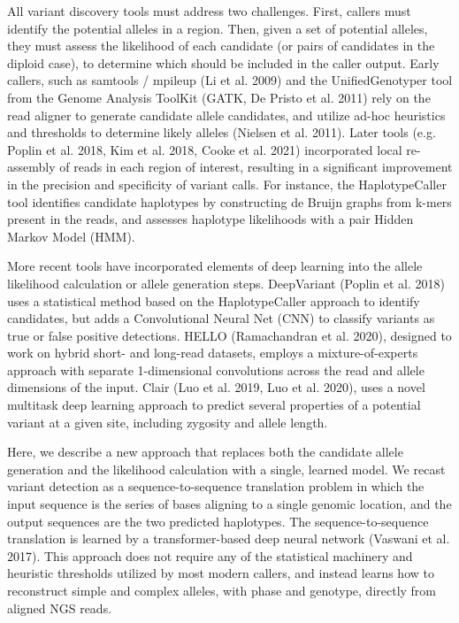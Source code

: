 \documentclass[]{article}
\begin{document}
All variant discovery tools must address two challenges. First, callers must identify the potential alleles in a region. Then, given a set of potential alleles, they must assess the likelihood of each candidate (or pairs of candidates in the diploid case), to determine which should be included in the caller output. Early callers, such as samtools / mpileup (Li et al. 2009) and the UnifiedGenotyper tool from the Genome Analysis ToolKit (GATK, De Pristo et al. 2011) rely on the read aligner to generate candidate allele candidates, and utilize ad-hoc heuristics and thresholds to determine likely alleles (Nielsen et al. 2011). Later tools (e.g. Poplin et al. 2018, Kim et al. 2018, Cooke et al. 2021) incorporated local re-assembly of reads in each region of interest, resulting in a significant improvement in the precision and specificity of variant calls. For instance, the HaplotypeCaller tool identifies candidate haplotypes by constructing de Bruijn graphs from k-mers present in the reads, and assesses haplotype likelihoods with a pair Hidden Markov Model (HMM). 

More recent tools have incorporated elements of deep learning into the allele likelihood calculation or allele generation steps. DeepVariant (Poplin et al. 2018) uses a statistical method based on the HaplotypeCaller approach to identify candidates, but adds a Convolutional Neural Net (CNN) to classify variants as true or false positive detections. HELLO (Ramachandran et al. 2020), designed to work on hybrid short- and long-read datasets, employs a mixture-of-experts approach with separate 1-dimensional convolutions across the read and allele dimensions of the input. Clair (Luo et al. 2019, Luo et al. 2020), uses a novel multitask deep learning approach to predict several properties of a potential variant at a given site, including zygosity and allele length. 

Here, we describe a new approach that replaces both the candidate allele generation and the likelihood calculation with a single, learned model. We recast variant detection as a sequence-to-sequence translation problem in which the input sequence is the series of bases aligning to a single genomic location, and the output sequences are the two predicted haplotypes. The sequence-to-sequence translation is learned by a transformer-based deep neural network (Vaswani et al. 2017). This approach does not require any of the statistical machinery and heuristic thresholds utilized by most modern callers, and instead learns how to reconstruct simple and complex alleles, with phase and genotype, directly from aligned NGS reads. 
\end{document}
